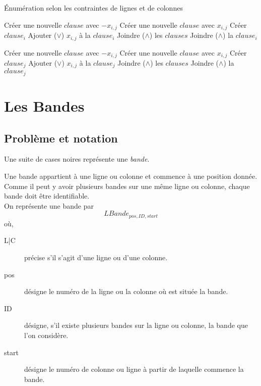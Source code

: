 \documentclass[a4paper,12pt]{report}
\begin{document}
\begin{algorithm}
\caption{Énumération selon les contraintes de lignes et de colonnes}
\begin{algorithmic}
				\State Créer une nouvelle $clause$ avec $-x_{i,j}$
				\State Créer une nouvelle $clause$ avec $x_{i,j}$
				 \State Créer $clause_i$
				\EndIf
				\State	Ajouter ($\vee$) $x_{i,j}$ à la $clause_i$ 
			\EndIf
		\State Joindre ($\wedge$) les $clauses$
		\EndFor
			\State Joindre ($\wedge$) la $clause_i$
		\EndIf
\EndFor

	
				\State Créer une nouvelle $clause$ avec $-x_{i,j}$
				\State Créer une nouvelle $clause$ avec $x_{i,j}$
				 \State Créer $clause_j$
				\EndIf
				\State	Ajouter ($\vee$) $x_{i,j}$ à la $clause_j$ 
			\EndIf
		\State Joindre ($\wedge$) les $clauses$
		\EndFor
			\State Joindre ($\wedge$) la $clause_j$
		\EndIf
\EndFor
\end{algorithmic}
\end{algorithm}


\chapter{Les Bandes}
\section{Problème et notation}

Une suite de cases noires représente une \textit{bande}. 

Une bande appartient à une ligne ou colonne et commence à une position donnée. Comme il peut y avoir plusieurs bandes sur une même ligne ou colonne, chaque bande doit être identifiable.\\

On représente une bande par $$LBande_{pos,ID,start}$$
où,
\begin{description}
\item[L|C] précise s'il s'agit d'une ligne ou d'une colonne.
\item[pos] désigne le numéro de la ligne ou la colonne où est située la bande.
\item[ID] désigne, s'il existe plusieurs bandes sur la ligne ou colonne, la bande que l'on considère.
\item[start] désigne le numéro de colonne ou ligne à partir de laquelle commence la bande.\\
\end{description}
\end{document}
